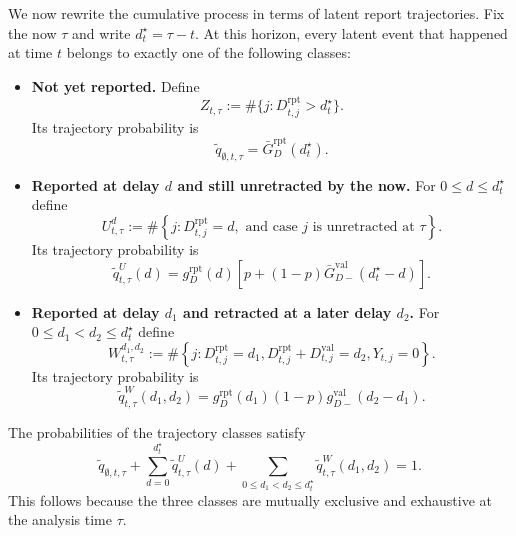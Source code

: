 \documentclass{article}
\theoremstyle{definition}
\theoremstyle{remark}
\begin{document}
We now rewrite the cumulative process in terms of latent report trajectories. Fix the now $\tau$ and write $d_t^{\star}=\tau-t$. At this horizon, every latent event that happened at time $t$ belongs to exactly one of the following classes:
\begin{itemize}
    \item \textbf{Not yet reported.} Define
    \begin{equation}
        Z_{t,\tau}
        :=
        \#\{j:D^{\mathrm{rpt}}_{t,j}>d_t^{\star}\}.
    \end{equation}
    Its trajectory probability is
    \begin{equation}\label{qemptycum}
        \tilde q_{\emptyset,t,\tau}
        =
        \bar G_D^{\mathrm{rpt}}(d_t^{\star}).
    \end{equation}

    \item \textbf{Reported at delay $d$ and still unretracted by the now.} For $0\leq d\leq d_t^{\star}$ define
    \begin{equation}\label{Udef}
        U_{t,\tau}^{d}
        :=
        \#\left\{
        j:
        D^{\mathrm{rpt}}_{t,j}=d,
        \text{ and case }j\text{ is unretracted at }\tau
        \right\}.
    \end{equation}
    Its trajectory probability is
    \begin{equation}\label{qUcum}
        \tilde q_{t,\tau}^{U}(d)
        =
        g_D^{\mathrm{rpt}}(d)
        \left[
        p
        +(1-p)\bar G_{D-}^{\mathrm{val}}(d_t^{\star}-d)
        \right].
    \end{equation}

    \item \textbf{Reported at delay $d_1$ and retracted at a later delay $d_2$.} For $0\leq d_1<d_2\leq d_t^{\star}$ define
    \begin{equation}\label{Wdef}
        W_{t,\tau}^{d_1,d_2}
        :=
        \#\left\{
        j:
        D^{\mathrm{rpt}}_{t,j}=d_1,
        D^{\mathrm{rpt}}_{t,j}+D^{\mathrm{val}}_{t,j}=d_2,
        Y_{t,j}=0
        \right\}.
    \end{equation}
    Its trajectory probability is
    \begin{equation}\label{qWcum}
        \tilde q_{t,\tau}^{W}(d_1,d_2)
        =
        g_D^{\mathrm{rpt}}(d_1)
        (1-p)
        g_{D-}^{\mathrm{val}}(d_2-d_1).
    \end{equation}
\end{itemize}
The probabilities of the trajectory classes satisfy
\begin{equation}\label{trajectorypartition}
    \tilde q_{\emptyset,t,\tau}
    +
    \sum_{d=0}^{d_t^{\star}}\tilde q_{t,\tau}^{U}(d)
    +
    \sum_{0\leq d_1<d_2\leq d_t^{\star}}
    \tilde q_{t,\tau}^{W}(d_1,d_2)
    =1.
\end{equation}
This follows because the three classes are mutually exclusive and exhaustive at the analysis time $\tau$.
\end{document}
